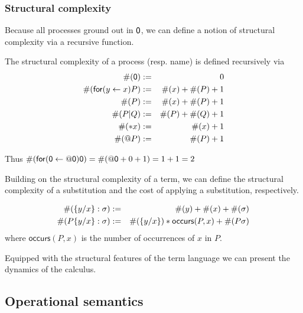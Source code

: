 \subsubsection{Structural complexity}
Because all processes ground out in $\mathsf{0}$, we can define a notion
of structural complexity via a recursive function.

\begin{definition}
  The structural complexity of a process (resp. name) is defined
  recursively via
  \begin{eqnarray}
    \#(\pzero) & := & 0 \nonumber \\
    \#(\prefix{x}{y}{P}) & := & \#(x) + \#(P) + 1 \nonumber \\
    \#(\output{x}{P}) & := & \#(x) + \#(P) + 1 \nonumber \\
    \#(P\mathsf{|}Q) & := & \#(P) + \#(Q) + 1 \nonumber \\
    \#(\dropn{x}) & := & \#(x) + 1 \nonumber \\
    \#(\quotep{P}) & := & \#(P) + 1 \nonumber
  \end{eqnarray}
\end{definition}

\begin{example}
  Thus $\#(\mathsf{for(}\mathsf{0} \leftarrow \mathsf{@} \mathsf{0} \mathsf{)} \mathsf{0}) = \#(\mathsf{@} \mathsf{0} + 0 + 1) = 1 + 1 = 2$
\end{example}

Building on the structural complexity of a term, we can define the
structural complexity of a substitution and the cost of applying a
substitution, respectively.

\begin{definition}
  \begin{eqnarray}
    \#(\{ y / x \}:\sigma) & := & \#(y) + \#(x) + \#(\sigma) \nonumber \\
    \#(P\{ y / x \}:\sigma) & := & \#(\{ y / x \}) * \mathsf{occurs}(P,x) + \#(P\sigma) \nonumber
  \end{eqnarray}
  where $\mathsf{occurs}(P,x)$ is the number of occurrences of $x$ in $P$.
\end{definition}

Equipped with the structural features of the term language we can
present the dynamics of the calculus.

\subsection{Operational semantics}

